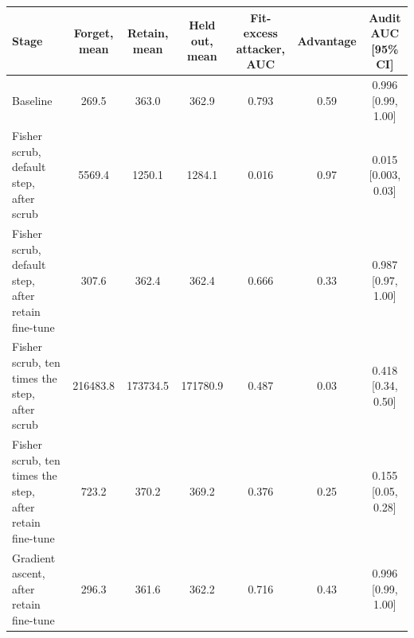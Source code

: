 \begin{tabular}{lcccccc}
\toprule
Stage & Forget, mean & Retain, mean & Held out, mean & Fit-excess attacker, AUC & Advantage & Audit AUC [95\% CI] \\
\midrule
Baseline & 269.5 & 363.0 & 362.9 & 0.793 & 0.59 & 0.996 [0.99, 1.00] \\
Fisher scrub, default step, after scrub & 5569.4 & 1250.1 & 1284.1 & 0.016 & 0.97 & 0.015 [0.003, 0.03] \\
Fisher scrub, default step, after retain fine-tune & 307.6 & 362.4 & 362.4 & 0.666 & 0.33 & 0.987 [0.97, 1.00] \\
Fisher scrub, ten times the step, after scrub & 216483.8 & 173734.5 & 171780.9 & 0.487 & 0.03 & 0.418 [0.34, 0.50] \\
Fisher scrub, ten times the step, after retain fine-tune & 723.2 & 370.2 & 369.2 & 0.376 & 0.25 & 0.155 [0.05, 0.28] \\
Gradient ascent, after retain fine-tune & 296.3 & 361.6 & 362.2 & 0.716 & 0.43 & 0.996 [0.99, 1.00] \\
\bottomrule
\end{tabular}
